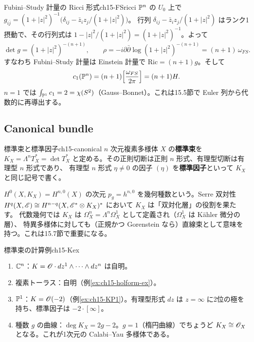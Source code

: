 \begin{myex}{Fubini--Study 計量の Ricci 形式}{ch15-FSricci}
$\mathbb{P}^n$ の $U_0$ 上で $g_{i\bar j} = (1+|z|^2)^{-1}\big(\delta_{ij} - \bar z_iz_j/(1+|z|^2)\big)$。
行列 $\delta_{ij} - \bar z_iz_j/(1+|z|^2)$ はランク1摂動で、その行列式は $1 - |z|^2/(1+|z|^2) = (1+|z|^2)^{-1}$。よって
\[
\det g = (1+|z|^2)^{-(n+1)},\qquad
\rho = -i\partial\bar\partial\log(1+|z|^2)^{-(n+1)} = (n+1)\,\omega_{FS}.
\]
すなわち Fubini--Study 計量は Einstein 計量で $\mathrm{Ric} = (n+1)g$。そして
\[
c_1(\mathbb{P}^n) = (n+1)\Big[\frac{\omega_{FS}}{2\pi}\Big] = (n+1)H .
\]
$n=1$ では $\int_{\mathbb{P}^1}c_1 = 2 = \chi(S^2)$（Gauss--Bonnet）。これは15.5節で Euler 列から代数的に再導出する。
\end{myex}

\subsection{Canonical bundle}

\begin{mydef}{標準束と標準因子}{ch15-canonical}
$n$ 次元複素多様体 $X$ の\textbf{標準束}を $K_X = \Lambda^nT^*_X = \det T^*_X$ と定める。その正則切断は正則 $n$ 形式、有理型切断は有理型 $n$ 形式であり、
有理型 $n$ 形式 $\eta\neq0$ の因子 $(\eta)$ を\textbf{標準因子}といって $K_X$ と同じ記号で書く。
\end{mydef}

$H^0(X,K_X) = H^{n,0}(X)$ の次元 $p_g = h^{n,0}$ を幾何種数という。Serre 双対性
$H^q(X,\mathscr{E})\cong H^{n-q}(X,\mathscr{E}^*\otimes K_X)^*$ において $K_X$ は「双対化層」の役割を果たす。
代数幾何では $K_X$ は $\Omega^n_X = \Lambda^n\Omega^1_X$ として定義され（$\Omega^1_X$ は K\"ahler 微分の層）、
特異多様体に対しても（正規かつ Gorenstein なら）直線束として意味を持つ。これは15.7節で重要になる。

\begin{myex}{標準束の計算例}{ch15-Kex}
\begin{enumerate}
\item $\mathbb{C}^n$：$K = \mathscr{O}\cdot dz^1\wedge\cdots\wedge dz^n$ は自明。
\item 複素トーラス：自明（例\ref{ex:ch15-holform-ex}）。
\item $\mathbb{P}^1$：$K = \mathscr{O}(-2)$（例\ref{ex:ch15-KP1}）。有理型形式 $dz$ は $z=\infty$ に2位の極を持ち、標準因子は $-2\cdot[\infty]$。
\item 種数 $g$ の曲線：$\deg K_X = 2g-2$。$g=1$（楕円曲線）でちょうど $K_X\cong\mathscr{O}_X$ となる。これが1次元の Calabi--Yau 多様体である。
\end{enumerate}
\end{myex}

